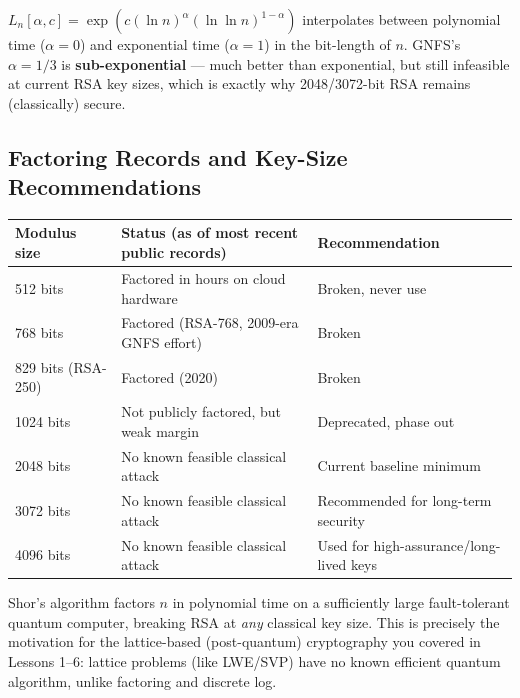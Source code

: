 \begin{remark}[$L$-notation]
$L_n[\alpha, c] = \exp\left(c (\ln n)^\alpha (\ln \ln n)^{1-\alpha}\right)$ interpolates between polynomial time ($\alpha = 0$) and exponential time ($\alpha = 1$) in the bit-length of $n$. GNFS's $\alpha = 1/3$ is \textbf{sub-exponential} — much better than exponential, but still infeasible at current RSA key sizes, which is exactly why 2048/3072-bit RSA remains (classically) secure.
\end{remark}

\subsection{Factoring Records and Key-Size Recommendations}

\begin{center}
\begin{tabular}{lll}
\toprule
\textbf{Modulus size} & \textbf{Status (as of most recent public records)} & \textbf{Recommendation} \\
\midrule
512 bits & Factored in hours on cloud hardware & Broken, never use \\
768 bits & Factored (RSA-768, 2009-era GNFS effort) & Broken \\
829 bits (RSA-250) & Factored (2020) & Broken \\
1024 bits & Not publicly factored, but weak margin & Deprecated, phase out \\
2048 bits & No known feasible classical attack & Current baseline minimum \\
3072 bits & No known feasible classical attack & Recommended for long-term security \\
4096 bits & No known feasible classical attack & Used for high-assurance/long-lived keys \\
\bottomrule
\end{tabular}
\end{center}

\begin{remark}
Shor's algorithm factors $n$ in polynomial time on a sufficiently large fault-tolerant quantum computer, breaking RSA at \emph{any} classical key size. This is precisely the motivation for the lattice-based (post-quantum) cryptography you covered in Lessons 1--6: lattice problems (like LWE/SVP) have no known efficient quantum algorithm, unlike factoring and discrete log.
\end{remark}

